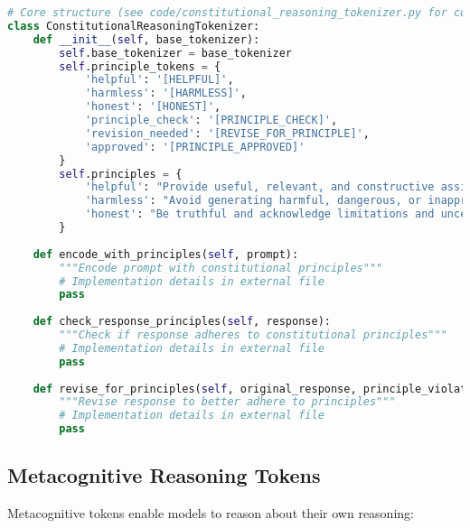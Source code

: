 \begin{lstlisting}[language=Python, caption=Constitutional AI principle tokens]
# Core structure (see code/constitutional_reasoning_tokenizer.py for complete implementation)
class ConstitutionalReasoningTokenizer:
    def __init__(self, base_tokenizer):
        self.base_tokenizer = base_tokenizer
        self.principle_tokens = {
            'helpful': '[HELPFUL]',
            'harmless': '[HARMLESS]',
            'honest': '[HONEST]',
            'principle_check': '[PRINCIPLE_CHECK]',
            'revision_needed': '[REVISE_FOR_PRINCIPLE]',
            'approved': '[PRINCIPLE_APPROVED]'
        }
        self.principles = {
            'helpful': "Provide useful, relevant, and constructive assistance",
            'harmless': "Avoid generating harmful, dangerous, or inappropriate content",
            'honest': "Be truthful and acknowledge limitations and uncertainties"
        }
        
    def encode_with_principles(self, prompt):
        """Encode prompt with constitutional principles"""
        # Implementation details in external file
        pass
    
    def check_response_principles(self, response):
        """Check if response adheres to constitutional principles"""
        # Implementation details in external file
        pass
    
    def revise_for_principles(self, original_response, principle_violations):
        """Revise response to better adhere to principles"""
        # Implementation details in external file
        pass
\end{lstlisting}

\subsection{Metacognitive Reasoning Tokens}

Metacognitive tokens enable models to reason about their own reasoning:

